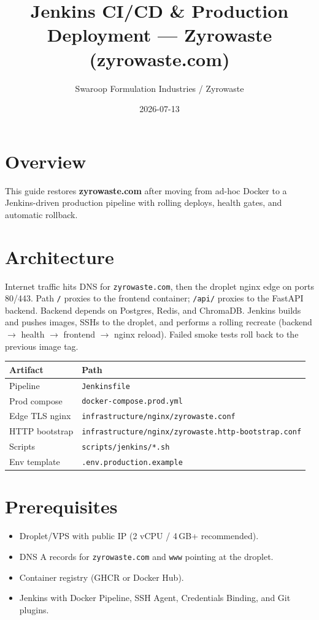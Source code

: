 \documentclass[12pt,a4paper]{article}
\title{Jenkins CI/CD \& Production Deployment --- Zyrowaste (zyrowaste.com)}
\author{Swaroop Formulation Industries / Zyrowaste}
\date{2026-07-13}
\begin{document}
\maketitle

\section{Overview}
This guide restores \textbf{zyrowaste.com} after moving from ad-hoc Docker to a Jenkins-driven production pipeline with rolling deploys, health gates, and automatic rollback.

\section{Architecture}
Internet traffic hits DNS for \texttt{zyrowaste.com}, then the droplet nginx edge on ports 80/443. Path \texttt{/} proxies to the frontend container; \texttt{/api/} proxies to the FastAPI backend. Backend depends on Postgres, Redis, and ChromaDB. Jenkins builds and pushes images, SSHs to the droplet, and performs a rolling recreate (backend $\rightarrow$ health $\rightarrow$ frontend $\rightarrow$ nginx reload). Failed smoke tests roll back to the previous image tag.

\begin{tabular}{@{}ll@{}}
\toprule
Artifact & Path \\
\midrule
Pipeline & \texttt{Jenkinsfile} \\
Prod compose & \texttt{docker-compose.prod.yml} \\
Edge TLS nginx & \texttt{infrastructure/nginx/zyrowaste.conf} \\
HTTP bootstrap & \texttt{infrastructure/nginx/zyrowaste.http-bootstrap.conf} \\
Scripts & \texttt{scripts/jenkins/*.sh} \\
Env template & \texttt{.env.production.example} \\
\bottomrule
\end{tabular}

\section{Prerequisites}
\begin{itemize}
  \item Droplet/VPS with public IP (2 vCPU / 4\,GB+ recommended).
  \item DNS A records for \texttt{zyrowaste.com} and \texttt{www} pointing at the droplet.
  \item Container registry (GHCR or Docker Hub).
  \item Jenkins with Docker Pipeline, SSH Agent, Credentials Binding, and Git plugins.
\end{itemize}
\end{document}
